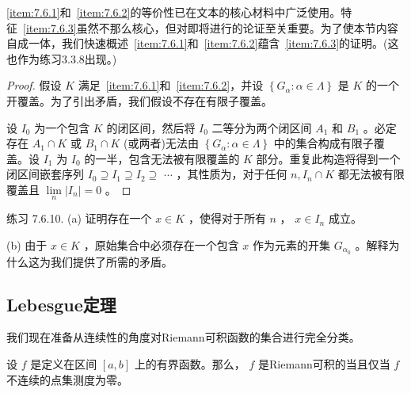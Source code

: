 \ref{item:7.6.1}和~\ref{item:7.6.2}的等价性已在文本的核心材料中广泛使用。特征~\ref{item:7.6.3}虽然不那么核心，但对即将进行的论证至关重要。为了使本节内容自成一体，我们快速概述~\ref{item:7.6.1}和~\ref{item:7.6.2}蕴含~\ref{item:7.6.3}的证明。(这也作为练习3.3.8出现。)

\begin{proof}
  假设 \(K\) 满足~\ref{item:7.6.1}和~\ref{item:7.6.2}，并设 \(\left\{  {{G}_{\alpha } : \alpha  \in  \Lambda }\right\}\) 是 \(K\) 的一个开覆盖。为了引出矛盾，我们假设不存在有限子覆盖。

设 \({I}_{0}\) 为一个包含 \(K\) 的闭区间，然后将 \({I}_{0}\) 二等分为两个闭区间 \({A}_{1}\) 和 \({B}_{1}\) 。必定存在 \({A}_{1} \cap  K\) 或 \({B}_{1} \cap  K\) (或两者)无法由 \(\left\{  {{G}_{\alpha } : \alpha  \in  \Lambda }\right\}\) 中的集合构成有限子覆盖。设 \({I}_{1}\) 为 \({I}_{0}\) 的一半，包含无法被有限覆盖的 \(K\) 部分。重复此构造将得到一个闭区间嵌套序列 \({I}_{0} \supseteq  {I}_{1} \supseteq  {I}_{2} \supseteq\)  \(\cdots\) ，其性质为，对于任何 \(n,{I}_{n} \cap  K\) 都无法被有限覆盖且 \(\mathop{\lim }\limits_{n}\left| {I}_{n}\right|  = 0\) 。
\end{proof}


练习 7.6.10. (a) 证明存在一个 \(x \in  K\) ，使得对于所有 \(n\) ， \(x \in  {I}_{n}\) 成立。

(b) 由于 \(x \in  K\) ，原始集合中必须存在一个包含 \(x\) 作为元素的开集 \({G}_{{\alpha }_{0}}\) 。解释为什么这为我们提供了所需的矛盾。

\subsection{Lebesgue定理}

我们现在准备从连续性的角度对Riemann可积函数的集合进行完全分类。

\begin{Thm}[Lebesgue定理]
  \label{thm:7.6.5}
  设 \(f\) 是定义在区间 \(\left\lbrack  {a,b}\right\rbrack\) 上的有界函数。那么， \(f\) 是Riemann可积的当且仅当 \(f\) 不连续的点集测度为零。
\end{Thm}

